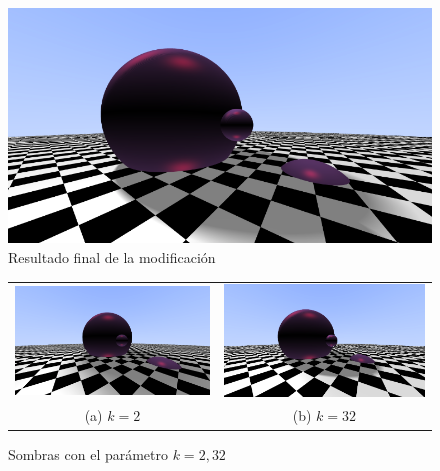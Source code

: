 \begin{figure} [ht]
    \centering
    \includegraphics[scale = 0.4]{img/C8/sombras-final.png}
    \caption{Resultado final de la modificación}
    \label{fig:sombras-final}
\end{figure}


\begin{figure}[ht]
    \centering
    \begin{tabular}{cc}
        \includegraphics[scale=0.25]{img/C8/sombras-k-2.png} &
      \includegraphics[scale=0.25]{img/C8/sombras-k-32.png} \\    
    (a) $k=2$ & (b) $k=32$  \\
    \end{tabular}
    \caption{Sombras con el parámetro $k=2,32$}
    \label{fig:sombras-k}
\end{figure}

